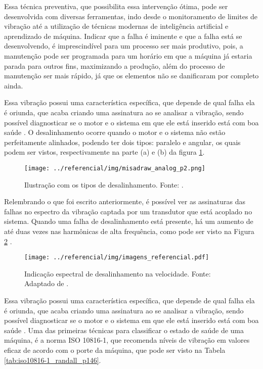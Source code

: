 \documentclass[a4paper]{ifacconf}
\begin{document}
Essa técnica preventiva, que possibilita essa intervenção ótima, pode ser desenvolvida com diversas ferramentas, indo desde o monitoramento
de limites de vibração até a utilização de técnicas modernas de inteligência artificial e aprendizado de máquina. Indicar que a falha é
iminente e que a falha está se desenvolvendo, é imprescindível para um processo ser mais produtivo, pois, a manutenção pode ser programada
para um horário em que a máquina já estaria parada para outros fins, maximizando a produção, além do processo de manutenção ser mais rápido, 
já que os elementos não se danificaram por completo ainda.

Essa vibração possui uma característica específica, que depende de qual falha ela é oriunda, que acaba criando uma assinatura
ao se analisar a vibração, sendo possível diagnosticar se o motor e o sistema em que ele está inserido está com boa saúde \cite{Wu2013}.
O desalinhamento ocorre quando o motor e o sistema não estão perfeitamente alinhados, podendo ter dois tipos: paralelo e angular, os quais 
podem ser vistos, respectivamente na parte (a) e (b) da figura \ref{fig:misadraw_analog_p2}.

\begin{figure}[H]
  \begin{center}
      \texttt{[image: ../referencial/img/misadraw\_analog\_p2.png]}
  \end{center}
  \caption{Ilustração com os tipos de desalinhamento. Fonte: \cite{Sopcik2019}.}
  \label{fig:misadraw_analog_p2}
\end{figure}

Relembrando o que foi escrito anteriormente, é possível ver as assinaturas das falhas no espectro da vibração captada por um transdutor
que está acoplado no sistema. Quando uma falha de desalinhamento está presente, há um aumento de até duas vezes nas harmônicas de alta 
frequência, como pode ser visto na Figura \ref{fig:misa_analog_p2} \cite{Sopcik2019}.

\begin{figure}[H]
  \begin{center}
      \texttt{[image: ../referencial/img/imagens\_referencial.pdf]}
  \end{center}
  \caption{Indicação espectral de desalinhamento na velocidade. Fonte: Adaptado de \cite{Sopcik2019}.}
  \label{fig:misa_analog_p2}
\end{figure}

Essa vibração possui uma característica específica, que depende de qual falha ela é oriunda, que acaba criando uma assinatura
ao se analisar a vibração, sendo possível diagnosticar se o motor e o sistema em que ele está inserido está com boa saúde \cite{Wu2013}.
Uma das primeiras técnicas para classificar o estado de saúde de uma máquina, é a norma ISO 10816-1, que recomenda níveis de vibração 
em valores eficaz de acordo com o porte da máquina, que pode ser visto na Tabela \ref{tab:iso10816-1_randall_p146}.
\end{document}
